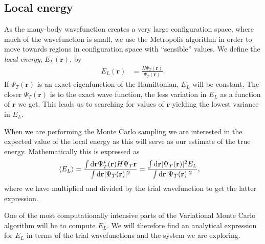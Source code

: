 \documentclass[
    a4paper, aps, twocolumn, floatfix, superscriptaddress,
    nofootinbib]{revtex4-1}
\newcommand{\vf}{\mathbf}
\newcommand{\1}{\mathds{1}}
\begin{document}
    \subsection{Local energy}
        As the many-body wavefunction creates a very large configuration space,
        where much of the wavefunction is small, we use the Metropolis algorithm
        in order to move towards regions in configuration space with
        ``sensible'' values. We define the \emph{local energy}, $E_L(\vf{r})$,
        by
        \begin{align}
            E_L(\vf{r})
            &= \frac{H\Psi_T(\vf{r})}{\Psi_T(\vf{r})}.
        \end{align}
        If $\Psi_T(\vf{r})$ is an exact eigenfunction of the Hamiltonian, $E_L$
        will be constant. The closer $\Psi_T(\vf{r})$ is to the exact wave
        function, the less variation in $E_L$ as a function of $\vf{r}$ we get.
        This leads us to searching for values of $\vf{r}$ yielding the lowest
        variance in $E_L$.

        When we are performing the Monte Carlo sampling we are interested in the
        expected value of the local energy as this will serve as our estimate of
        the true energy. Mathematically this is expressed as
        \begin{align}
            \expval{E_L}
            &=
            \frac{\int\dd \vf{r}\Psi_T^{*}(\vf{r})H\Psi_T{\vf{r}}}
            {\int\dd \vf{r}|\Psi_T(\vf{r})|^2}
            =
            \frac{
                \int\dd \vf{r}|\Psi_T(\vf{r})|^2 E_L
            }{
                \int\dd \vf{r}|\Psi_T(\vf{r})|^2
            },
        \end{align}
        where we have multiplied and divided by the trial wavefunction to get
        the latter expression.

        One of the most computationally intensive parts of the Variational Monte
        Carlo algorithm will be to compute $E_L$. We will therefore find an
        analytical expression for $E_L$ in terms of the trial wavefunctions and
        the system we are exploring.
\end{document}
